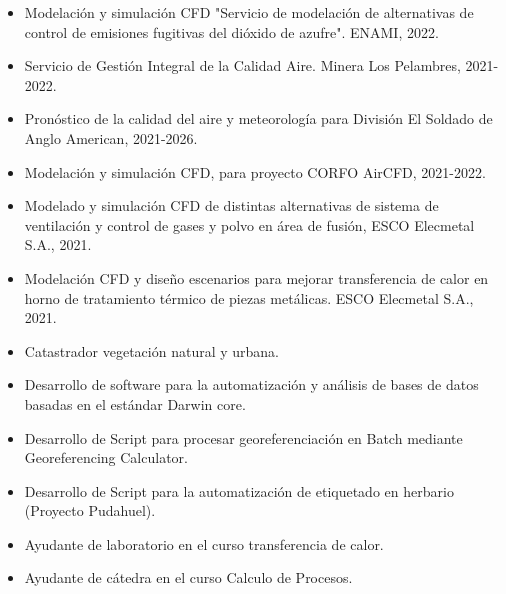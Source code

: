 \documentclass[10pt,letter,ragged2e]{altacv}
\begin{document}
\begin{itemize}
	\item Modelación y simulación CFD "Servicio de modelación de alternativas de control de emisiones fugitivas del dióxido de azufre". ENAMI, 2022.
	\item Servicio de Gestión Integral de la Calidad Aire. Minera Los Pelambres, 2021-2022.
  \item Pronóstico de la calidad del aire y meteorología para División El Soldado de Anglo American, 2021-2026.
  \item Modelación y simulación CFD, para proyecto CORFO AirCFD, 2021-2022.
  \item  Modelado y simulación CFD de distintas alternativas de sistema de ventilación y control de gases y polvo en área de fusión, ESCO Elecmetal S.A., 2021.
  \item Modelación CFD y diseño escenarios para mejorar transferencia de calor en horno de tratamiento térmico de piezas metálicas. ESCO Elecmetal S.A., 2021.
\end{itemize}

\divider

\begin{itemize}
\item Catastrador vegetación natural y urbana.
\item{Desarrollo de software para la automatización y análisis de bases de datos basadas en el estándar Darwin core.}
\item{Desarrollo de Script para procesar georeferenciación en Batch mediante Georeferencing Calculator.}
\item Desarrollo de Script para la automatización de etiquetado en herbario (Proyecto Pudahuel).
\end{itemize}

\divider

\begin{itemize}
\item{Ayudante de laboratorio en el curso transferencia de calor.}
\item{Ayudante de cátedra en el curso Calculo de Procesos. }
\end{itemize}
\end{document}
